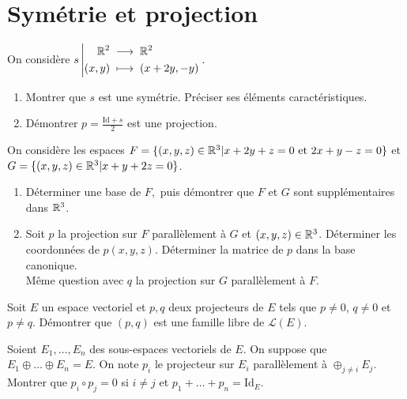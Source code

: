 \documentclass{book}
\begin{document}
\section{Symétrie et projection}
\begin{Exercice}
On considère ${s}\left|\begin{aligned}{\mathbb{R}^2}&\;\longrightarrow\;{\mathbb{R}^2}\\{(x,y)}&\;\longmapsto\;{(x + 2y, -y)}\end{aligned}\right..$
\begin{enumerate}
\item Montrer que $s$ est une symétrie. Préciser ses éléments caractéristiques.
\item Démontrer $p=\frac{\mathrm{Id}+s}{2}$ est une projection.
\end{enumerate}
\end{Exercice}
\begin{Exercice}
On considère les espaces $F = \{(x, y, z) \in \mathbb{R}^3| x+2y+z = 0\text{ et }2x+y-z = 0\}$ et $G = \{(x, y, z) \in \mathbb{R}^3| x+y+2z = 0\}$.
\begin{enumerate}
\item Déterminer une base de $F,$ puis démontrer que $F$ et $G$ sont supplémentaires dans $\mathbb{R}^3$.
\item  Soit $p$ la projection sur $F$ parallèlement à $G$ et $(x, y, z) \in \mathbb{R}^3$. Déterminer les
coordonnées de $p(x,y,z)$. Déterminer la matrice de $p$ dans la base canonique.\\
Même question avec $q$ la projection sur $G$ parallèlement à $F$.
\end{enumerate}
\end{Exercice}
\begin{Exercice}
Soit $E$ un espace vectoriel et $p,q$ deux projecteurs de $E$ tels que $p\neq 0$, $q\neq 0$ et $p\neq q$. Démontrer que $(p,q)$ est une famille libre de $\mathcal{L}(E)$.
\end{Exercice}
\begin{Exercice}
Soient $E_1,\dots ,E_n$ des sous-espaces vectoriels de $E$. On suppose que $E_1\oplus \dots \oplus E_n=E$. On note $p_i$ le projecteur sur $E_i$ parallèlement à $\oplus_{j\neq i}E_j$.\\ 
Montrer que $p_i\circ p_j=0$ si $i\neq j$ et $p_1+\dots+p_n=\mathrm{Id}_E$.
\end{Exercice}
\end{document}
